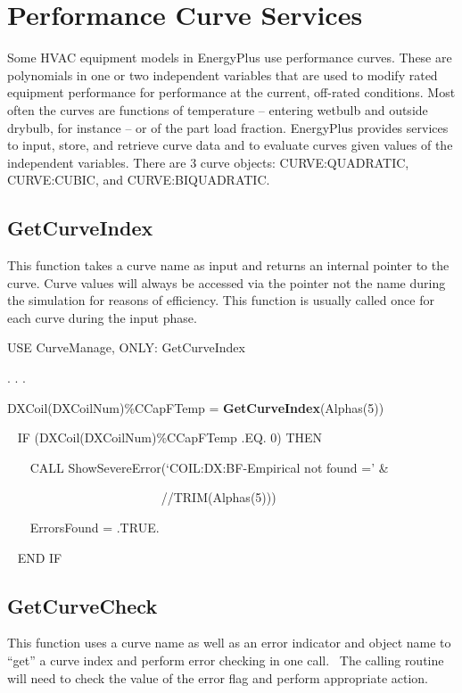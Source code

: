 \section{Performance Curve Services}\label{performance-curve-services}

Some HVAC equipment models in EnergyPlus use performance curves. These are polynomials in one or two independent variables that are used to modify rated equipment performance for performance at the current, off-rated conditions. Most often the curves are functions of temperature -- entering wetbulb and outside drybulb, for instance -- or of the part load fraction. EnergyPlus provides services to input, store, and retrieve curve data and to evaluate curves given values of the independent variables. There are 3 curve objects: CURVE:QUADRATIC, CURVE:CUBIC, and CURVE:BIQUADRATIC.

\subsection{GetCurveIndex}\label{getcurveindex}

This function takes a curve name as input and returns an internal pointer to the curve. Curve values will always be accessed via the pointer not the name during the simulation for reasons of efficiency. This function is usually called once for each curve during the input phase.

USE CurveManage, ONLY: GetCurveIndex

. . .

DXCoil(DXCoilNum)\%CCapFTemp = \textbf{GetCurveIndex}(Alphas(5))

~ IF (DXCoil(DXCoilNum)\%CCapFTemp .EQ. 0) THEN

~~~ CALL ShowSevereError(`COIL:DX:BF-Empirical not found =' \&

~~~~~~~~~~~~~~~~~~~~~~~~ //TRIM(Alphas(5)))

~~~ ErrorsFound = .TRUE.

~ END IF

\subsection{GetCurveCheck}\label{getcurvecheck}

This function uses a curve name as well as an error indicator and object name to ``get'' a curve index and perform error checking in one call.~ The calling routine will need to check the value of the error flag and perform appropriate action.

